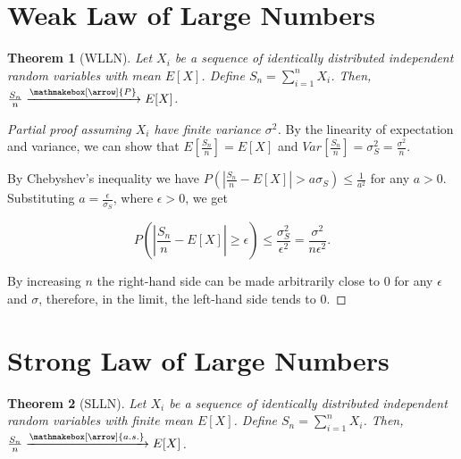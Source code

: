 \documentclass{book}
\theoremstyle{plain}%
\newtheorem{theorem}{Theorem}[section]
\theoremstyle{definition}
\newlength{\arrow}
\newcommand*{\myrightarrow}[1]{\xrightarrow{\mathmakebox[\arrow]{#1}}}
\begin{document}
\section{Weak Law of Large Numbers}

\begin{theorem}[WLLN]
Let $X_i$ be a sequence of identically distributed independent random variables with mean $E[X]$. Define $S_n = \sum_{i=1}^n X_i$. Then, $\frac{S_n}{n} \myrightarrow{P} E[X]$.

\end{theorem}

\begin{proof}[Partial proof assuming $X_i$ have finite variance $\sigma^2$]
By the linearity of expectation and variance, we can show that $E[\frac{S_n}{n}] = E[X]$ and $Var[\frac{S_n}{n}] = \sigma_S^2 = \frac{\sigma^2}{n}$.

By Chebyshev's inequality we have $P(|\frac{S_n}{n} - E[X]| > a\sigma_S) \leq \frac{1}{a^2}$ for any $a > 0$. Substituting $a = \frac{\epsilon}{\sigma_S}$, where $\epsilon > 0$, we get

$$P(|\frac{S_n}{n} - E[X]| \geq \epsilon) \leq \frac{\sigma_S^2}{\epsilon^2} = \frac{\sigma^2}{n\epsilon^2}.$$

By increasing $n$ the right-hand side can be made arbitrarily close to 0 for any $\epsilon$ and $\sigma$, therefore, in the limit, the left-hand side tends to 0.

\end{proof}
\section{Strong Law of Large Numbers}

\begin{theorem}[SLLN]
Let $X_i$ be a sequence of identically distributed independent random variables with finite mean $E[X]$. Define $S_n = \sum_{i=1}^n X_i$. Then, $\frac{S_n}{n} \myrightarrow{a.s.} E[X]$.

\end{theorem}
\end{document}

